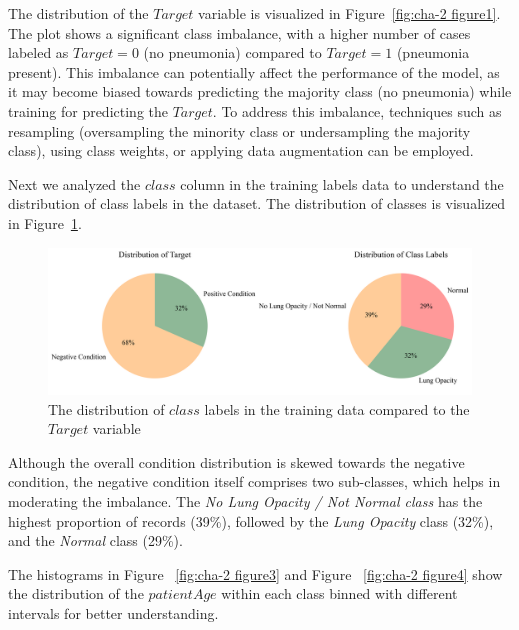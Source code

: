 The distribution of the $Target$ variable is visualized in Figure~\ref{fig:cha-2 figure1}. The plot shows a significant class imbalance, with a higher number of cases labeled as $Target = 0$ (no pneumonia) compared to $Target = 1$ (pneumonia present). This imbalance can potentially affect the performance of the model, as it may become biased towards predicting the majority class (no pneumonia) while training for predicting the $Target$.
To address this imbalance, techniques such as resampling (oversampling the minority class or undersampling the majority class), using class weights, or applying data augmentation can be employed.

Next we analyzed the $class$ column in the training labels data to understand the distribution of class labels in the dataset. The distribution of classes is visualized in Figure~\ref{fig:cha-2 figure2}.


\begin{figure}[H]
    \begin{center}
        \includegraphics[width = 1.0\textwidth]{figures/Figure4.png}
        \caption{The distribution of $class$ labels in the training data compared to the $Target$ variable}
        \label{fig:cha-2 figure2}
    \end{center}
\end{figure}

Although the overall condition distribution is skewed towards the negative condition, the negative condition itself comprises two sub-classes, which helps in moderating the imbalance. The \emph{No Lung Opacity / Not Normal class} has the highest proportion of records (39\%), followed by the \emph{Lung Opacity} class (32\%), and the \emph{Normal} class (29\%).

The histograms in Figure ~\ref{fig:cha-2 figure3} and Figure ~\ref{fig:cha-2 figure4} show the distribution of the $patientAge$ within each class binned with different intervals for better understanding.

